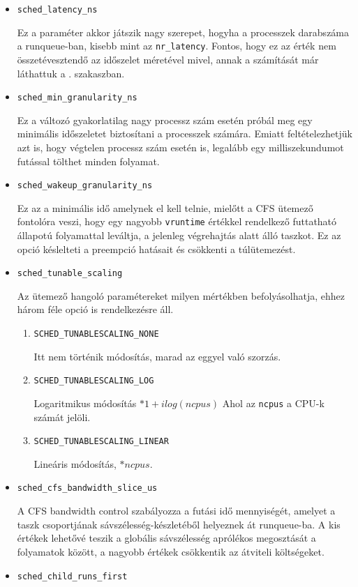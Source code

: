 \begin{itemize}
\item \texttt{sched\_latency\_ns}

Ez a paraméter akkor játszik nagy szerepet, hogyha a processzek darabszáma a runqueue-ban, kisebb mint az \texttt{nr\_latency}. Fontos, hogy ez az érték nem összetévesztendő az időszelet méretével mivel, annak a számítását már láthattuk a . szakaszban. 

\item \texttt{sched\_min\_granularity\_ns}

Ez a változó gyakorlatilag nagy processz szám esetén próbál meg egy minimális időszeletet biztosítani a processzek számára. Emiatt feltételezhetjük azt is, hogy végtelen processz szám esetén is, legalább egy milliszekundumot futással tölthet minden folyamat.

\item \texttt{sched\_wakeup\_granularity\_ns}

Ez az a minimális idő amelynek el kell telnie, mielőtt a CFS ütemező fontolóra veszi, hogy egy nagyobb \texttt{vruntime} értékkel rendelkező futtatható állapotú folyamattal leváltja, a jelenleg végrehajtás alatt álló taszkot.
Ez az opció késlelteti a preempció hatásait és csökkenti a túlütemezést. 

\item \texttt{sched\_tunable\_scaling}

Az ütemező hangoló paramétereket milyen mértékben befolyásolhatja, ehhez három féle opció is rendelkezésre áll.
\begin{enumerate}
\item \texttt{SCHED\_TUNABLESCALING\_NONE}

Itt nem történik módosítás, marad az eggyel való szorzás.
\item \texttt{SCHED\_TUNABLESCALING\_LOG}

Logaritmikus módosítás $*1+ilog(ncpus)$
Ahol az \texttt{ncpus} a CPU-k számát jelöli.

\item \texttt{SCHED\_TUNABLESCALING\_LINEAR}

Lineáris módosítás, $*ncpus$. 
\end{enumerate}

\item \texttt{sched\_cfs\_bandwidth\_slice\_us}

A CFS bandwidth control szabályozza a futási idő mennyiségét, amelyet a taszk csoportjának sávszélesség-készletéből helyeznek át runqueue-ba. A kis értékek lehetővé teszik a globális sávszélesség aprólékos megosztását a folyamatok között, a nagyobb értékek csökkentik az átviteli költségeket.
\item \texttt{sched\_child\_runs\_first}


\end{itemize}
